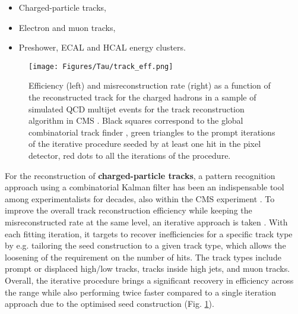 \begin{itemize}
    \item Charged-particle tracks,
    \item Electron and muon tracks,
    \item Preshower, ECAL and HCAL energy clusters.
\end{itemize}

\begin{figure}[ht!]
    \centering
    \texttt{[image: Figures/Tau/track\_eff.png]}
    \caption{Efficiency (left) and misreconstruction rate (right) as a function of the reconstructed track \pt for the charged hadrons in a sample of simulated QCD multijet events for the track reconstruction algorithm in CMS \cite{CMS:2017yfk}. Black squares correspond to the global combinatorial track finder \cite{CMS:2006myw}, green triangles to the prompt iterations of the iterative procedure \cite{CMS:2014pgm} seeded by at least one hit in the pixel detector, red dots to all the iterations of the procedure.}
    \label{fig:track_eff}
\end{figure}

For the reconstruction of \textbf{charged-particle tracks}, a pattern recognition approach using a combinatorial Kalman filter has been an indispensable tool among experimentalists for decades, also within the CMS experiment \cite{Adam:2005cg}. To improve the overall track reconstruction efficiency while keeping the misreconstructed rate at the same level, an iterative approach is taken \cite{CMS:2014pgm}. With each fitting iteration, it targets to recover inefficiencies for a specific track type by e.g. tailoring the seed construction to a given track type, which allows the loosening of the requirement on the number of hits. The track types include prompt or displaced high/low \pt tracks, tracks inside high \pt jets, and muon tracks. Overall, the iterative procedure brings a significant recovery in efficiency across the \pt range while also performing twice faster compared to a single iteration approach due to the optimised seed construction (Fig. \ref{fig:track_eff}).


